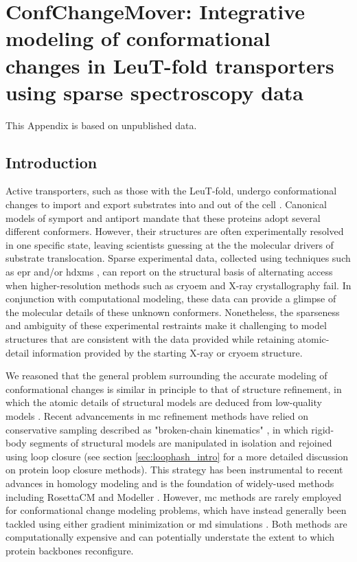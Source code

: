 \clearpage %

\chapter{ConfChangeMover: Integrative modeling of conformational changes in LeuT-fold transporters using sparse spectroscopy data} \label{app:confchangemover}

This Appendix is based on unpublished data.

\bigskip

\section{Introduction}

Active transporters, such as those with the LeuT-fold, undergo conformational changes to import and export substrates into and out of the cell \citep*{Kazmier2017}. Canonical models of symport and antiport mandate that these proteins adopt several different conformers. However, their structures are often experimentally resolved in one specific state, leaving scientists guessing at the the molecular drivers of substrate translocation. Sparse experimental data, collected using techniques such as \gls{epr} \citep*{Jeschke2012, Kazmier2014a} and/or \gls{hdxms} \citep*{Merkle2018}, can report on the structural basis of alternating access when higher-resolution methods such as \gls{cryoem} and X-ray crystallography fail. In conjunction with computational modeling, these data can provide a glimpse of the molecular details of these unknown conformers. Nonetheless, the sparseness and ambiguity of these experimental restraints make it challenging to model structures that are consistent with the data provided while retaining atomic-detail information provided by the starting X-ray or \gls{cryoem} structure.

We reasoned that the general problem surrounding the accurate modeling of conformational changes is similar in principle to that of structure refinement, in which the atomic details of structural models are deduced from low-quality models \citep*{Heo2019, Park2019, Read2019}. Recent advancements in \gls{mc} refinement methods have relied on conservative sampling described as "broken-chain kinematics" \citep*{Park2018}, in which rigid-body segments of structural models are manipulated in isolation and rejoined using loop closure (see section \ref{sec:loophash_intro} for a more detailed discussion on protein loop closure methods). This strategy has been instrumental to recent advances in homology modeling and is the foundation of widely-used methods including RosettaCM \citep*{Song2013} and Modeller \citep*{Eswar2006}. However, \gls{mc} methods are rarely employed for conformational change modeling problems, which have instead generally been tackled using either gradient minimization \cite*{Evans2020} or \gls{md} simulations \citep*{Marinelli2019, Sfriso2016}. Both methods are computationally expensive and can potentially understate the extent to which protein backbones reconfigure. 

